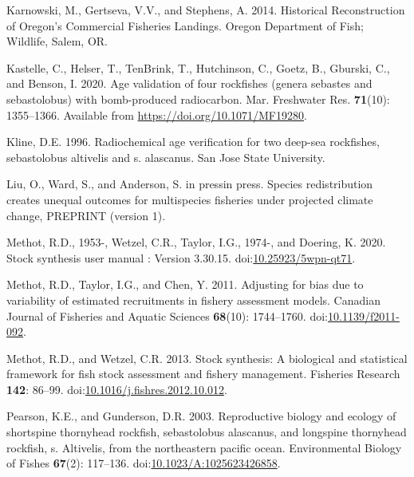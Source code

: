 \documentclass[11pt,
  letterpaper,
]{article}
\newlength{\cslhangindent}
\newenvironment{CSLReferences}[2] %
 {%
  \setlength{\parindent}{0pt}
  \ifodd #1 \everypar{\setlength{\hangindent}{\cslhangindent}}\ignorespaces\fi
  \ifnum #2 > 0
  \setlength{\parskip}{#2\baselineskip}
  \fi
 }%
 {}
\begin{document}
\begin{CSLReferences}{1}{0}
\leavevmode{}%
Karnowski, M., Gertseva, V.V., and Stephens, A. 2014. Historical {Reconstruction} of {Oregon}'s {Commercial} {Fisheries} {Landings}. Oregon Department of Fish; Wildlife, Salem, OR.

\leavevmode{}%
Kastelle, C., Helser, T., TenBrink, T., Hutchinson, C., Goetz, B., Gburski, C., and Benson, I. 2020. Age validation of four rockfishes (genera sebastes and sebastolobus) with bomb-produced radiocarbon. Mar. Freshwater Res. \textbf{71}(10): 1355--1366. Available from \url{https://doi.org/10.1071/MF19280}.

\leavevmode{}%
Kline, D.E. 1996. Radiochemical age verification for two deep-sea rockfishes, sebastolobus altivelis and s. alascanus. San Jose State University.

\leavevmode{}%
Liu, O., Ward, S., and Anderson, S. in pressin press. Species redistribution creates unequal outcomes for multispecies fisheries under projected climate change, PREPRINT (version 1).

\leavevmode{}%
Methot, R.D., 1953-, Wetzel, C.R., Taylor, I.G., 1974-, and Doering, K. 2020. Stock synthesis user manual : Version 3.30.15. doi:\href{https://doi.org/10.25923/5wpn-qt71}{10.25923/5wpn-qt71}.

\leavevmode{}%
Methot, R.D., Taylor, I.G., and Chen, Y. 2011. Adjusting for bias due to variability of estimated recruitments in fishery assessment models. Canadian Journal of Fisheries and Aquatic Sciences \textbf{68}(10): 1744--1760. doi:\href{https://doi.org/10.1139/f2011-092}{10.1139/f2011-092}.

\leavevmode{}%
Methot, R.D., and Wetzel, C.R. 2013. Stock synthesis: A biological and statistical framework for fish stock assessment and fishery management. Fisheries Research \textbf{142}: 86--99. doi:\href{https://doi.org/10.1016/j.fishres.2012.10.012}{10.1016/j.fishres.2012.10.012}.

\leavevmode{}%
Pearson, K.E., and Gunderson, D.R. 2003. Reproductive biology and ecology of shortspine thornyhead rockfish, sebastolobus alascanus, and longspine thornyhead rockfish, s. Altivelis, from the northeastern pacific ocean. Environmental Biology of Fishes \textbf{67}(2): 117--136. doi:\href{https://doi.org/10.1023/A:1025623426858}{10.1023/A:1025623426858}.


\end{CSLReferences}
\end{document}
